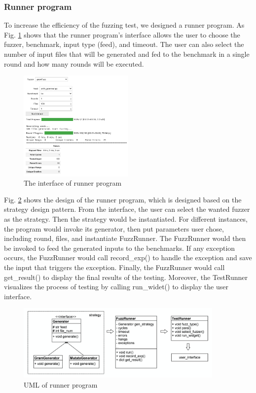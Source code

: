 \documentclass[11pt,a4paper]{article}
\begin{document}
\subsubsection{Runner program}
To increase the efficiency of the fuzzing test, we designed a runner program. As Fig. \ref{ui} shows that the runner program's interface allows the user to choose the fuzzer, benchmark, input type (feed), and timeout. The user can also select the number of input files that will be generated and fed to the benchmark in a single round and how many rounds will be executed. 
\begin{figure}[H]
    \centering
    \includegraphics[width=0.5\textwidth]{ui.png}
    \caption{ The interface of runner program}
    \label{ui}
\end{figure}
Fig. \ref{uml} shows the design of the runner program, which is designed based on the strategy design pattern. From the interface, the user can select the wanted fuzzer as the strategy. Then the strategy would be instantiated. For different instances, the program would invoke its generator, then put parameters user chose, including round, files, and instantiate {\cc FuzzRunner}. The {\cc FuzzRunner} would then be invoked to feed the generated inputs to the benchmarks. If any exception occurs, the {\cc FuzzRunner} would call {\cc record_exp()} to handle the exception and save the input that triggers the exception. Finally,  the {\cc FuzzRunner} would call {\cc get_result()} to display the final results of the testing. Moreover, the {\cc TestRunner} visualizes the process of testing by calling {\cc run_widet()} to display the user interface.
\begin{figure}[H]
    \centering
    \includegraphics[width=0.9\textwidth]{uml.png}
    \caption{UML of runner program}
    \label{uml}
\end{figure}
%
\end{document}
